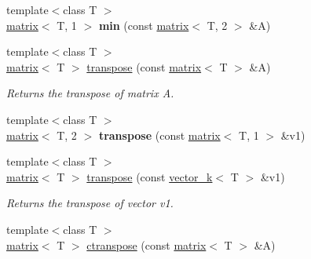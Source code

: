 \begin{DoxyCompactItemize}
\item 
\hypertarget{namespacekeycpp_aa14bd8b7f4585287019e5e6ebff8222b}{{\footnotesize template$<$class T $>$ }\\\hyperlink{classkeycpp_1_1matrix}{matrix}$<$ T, 1 $>$ {\bfseries min} (const \hyperlink{classkeycpp_1_1matrix}{matrix}$<$ T, 2 $>$ \&A)}\label{namespacekeycpp_aa14bd8b7f4585287019e5e6ebff8222b}

\item 
\hypertarget{namespacekeycpp_a7fd5ce0385e9cc7bed5b44ed8475e8aa}{{\footnotesize template$<$class T $>$ }\\\hyperlink{classkeycpp_1_1matrix}{matrix}$<$ T $>$ \hyperlink{namespacekeycpp_a7fd5ce0385e9cc7bed5b44ed8475e8aa}{transpose} (const \hyperlink{classkeycpp_1_1matrix}{matrix}$<$ T $>$ \&A)}\label{namespacekeycpp_a7fd5ce0385e9cc7bed5b44ed8475e8aa}

\begin{DoxyCompactList}\small\item\em Returns the transpose of matrix A. \end{DoxyCompactList}\item 
\hypertarget{namespacekeycpp_af86c195d39e32dd81020c07cab17baa9}{{\footnotesize template$<$class T $>$ }\\\hyperlink{classkeycpp_1_1matrix}{matrix}$<$ T, 2 $>$ {\bfseries transpose} (const \hyperlink{classkeycpp_1_1matrix}{matrix}$<$ T, 1 $>$ \&v1)}\label{namespacekeycpp_af86c195d39e32dd81020c07cab17baa9}

\item 
\hypertarget{namespacekeycpp_a24d241b78ac9d5764e08c3f03bdffd07}{{\footnotesize template$<$class T $>$ }\\\hyperlink{classkeycpp_1_1matrix}{matrix}$<$ T $>$ \hyperlink{namespacekeycpp_a24d241b78ac9d5764e08c3f03bdffd07}{transpose} (const \hyperlink{classkeycpp_1_1vector__k}{vector\-\_\-k}$<$ T $>$ \&v1)}\label{namespacekeycpp_a24d241b78ac9d5764e08c3f03bdffd07}

\begin{DoxyCompactList}\small\item\em Returns the transpose of vector v1. \end{DoxyCompactList}\item 
\hypertarget{namespacekeycpp_a14503c0419f365433d88fa081d473210}{{\footnotesize template$<$class T $>$ }\\\hyperlink{classkeycpp_1_1matrix}{matrix}$<$ T $>$ \hyperlink{namespacekeycpp_a14503c0419f365433d88fa081d473210}{ctranspose} (const \hyperlink{classkeycpp_1_1matrix}{matrix}$<$ T $>$ \&A)}\label{namespacekeycpp_a14503c0419f365433d88fa081d473210}


\end{DoxyCompactItemize}
